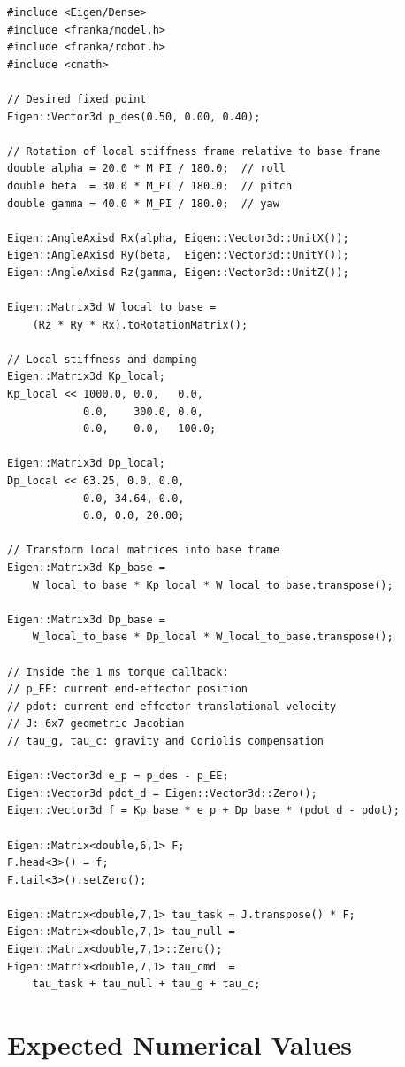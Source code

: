 \begin{lstlisting}[style=cppstyle,
  caption={Experiment 1: fixed-point tracking with rotated stiffness directions},
  label={lst:exp1_rotated_cpp}]
#include <Eigen/Dense>
#include <franka/model.h>
#include <franka/robot.h>
#include <cmath>

// Desired fixed point
Eigen::Vector3d p_des(0.50, 0.00, 0.40);

// Rotation of local stiffness frame relative to base frame
double alpha = 20.0 * M_PI / 180.0;  // roll
double beta  = 30.0 * M_PI / 180.0;  // pitch
double gamma = 40.0 * M_PI / 180.0;  // yaw

Eigen::AngleAxisd Rx(alpha, Eigen::Vector3d::UnitX());
Eigen::AngleAxisd Ry(beta,  Eigen::Vector3d::UnitY());
Eigen::AngleAxisd Rz(gamma, Eigen::Vector3d::UnitZ());

Eigen::Matrix3d W_local_to_base =
    (Rz * Ry * Rx).toRotationMatrix();

// Local stiffness and damping
Eigen::Matrix3d Kp_local;
Kp_local << 1000.0, 0.0,   0.0,
            0.0,    300.0, 0.0,
            0.0,    0.0,   100.0;

Eigen::Matrix3d Dp_local;
Dp_local << 63.25, 0.0, 0.0,
            0.0, 34.64, 0.0,
            0.0, 0.0, 20.00;

// Transform local matrices into base frame
Eigen::Matrix3d Kp_base =
    W_local_to_base * Kp_local * W_local_to_base.transpose();

Eigen::Matrix3d Dp_base =
    W_local_to_base * Dp_local * W_local_to_base.transpose();

// Inside the 1 ms torque callback:
// p_EE: current end-effector position
// pdot: current end-effector translational velocity
// J: 6x7 geometric Jacobian
// tau_g, tau_c: gravity and Coriolis compensation

Eigen::Vector3d e_p = p_des - p_EE;
Eigen::Vector3d pdot_d = Eigen::Vector3d::Zero();
Eigen::Vector3d f = Kp_base * e_p + Dp_base * (pdot_d - pdot);

Eigen::Matrix<double,6,1> F;
F.head<3>() = f;
F.tail<3>().setZero();

Eigen::Matrix<double,7,1> tau_task = J.transpose() * F;
Eigen::Matrix<double,7,1> tau_null = Eigen::Matrix<double,7,1>::Zero();
Eigen::Matrix<double,7,1> tau_cmd  =
    tau_task + tau_null + tau_g + tau_c;
\end{lstlisting}

\section{Expected Numerical Values}

